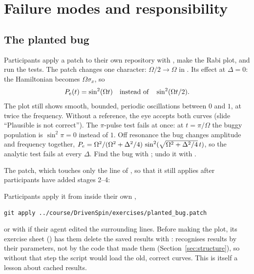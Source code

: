 \section{Failure modes and responsibility}\label{sec:failures}


\subsection{The planted bug}

Participants apply a patch to their own repository with , make the Rabi
plot, and run the tests. The patch changes one character: $\Omega/2 \to \Omega$ in
. Its effect at $\Delta = 0$: the Hamiltonian becomes $\Omega\sigma_x$, so
\begin{equation}
  P_e(t) = \sin^2(\Omega t) \quad\text{instead of}\quad \sin^2(\Omega t/2).
\end{equation}
The plot still shows smooth, bounded, periodic oscillations between $0$ and $1$, at twice
the frequency. Without a reference, the eye accepts both curves (slide ``Plausible is not
correct''). The $\pi$-pulse test fails at once: at $t = \pi/\Omega$ the buggy population
is $\sin^2\pi = 0$ instead of $1$. Off resonance the bug changes amplitude and frequency
together, $P_e = \Omega^2/(\Omega^2 + \Delta^2/4)\,\sin^2(\sqrt{\Omega^2 + \Delta^2/4}\,t)$,
so the analytic test fails at every $\Delta$. Find the bug with ; undo it with
.

The patch, which touches only the line of , so that it still applies
after participants have added stages 2--4:

Participants apply it from inside their own ,
\begin{lstlisting}
git apply ../course/DrivenSpin/exercises/planted_bug.patch
\end{lstlisting}
or with  if their agent edited the surrounding lines. Before making
the plot, its exercise sheet () has them delete the saved results
with :  recognises results by their parameters, not by the code that
made them (Section~\ref{sec:structure}), so without that step the script would load the old,
correct curves. This is itself a lesson about cached results.

